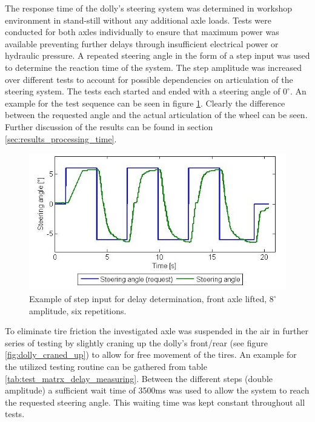 \documentclass[ExampleMasters.tex]{subfiles}
\begin{document}
The response time of the dolly's steering system was determined in workshop environment in stand-still without any additional axle loads. Tests were conducted for both axles individually to ensure that maximum power was available preventing further delays through insufficient electrical power or hydraulic pressure. A repeated steering angle in the form of a step input was used to determine the reaction time of the system. The step amplitude was increased over different tests to account for possible dependencies on articulation of the steering system. The tests each started and ended with a steering angle of $0^\circ .$ An example for the test sequence can be seen in figure \ref{fig:example_for_step_input_delay_measuring}. Clearly the difference between the requested angle and the actual articulation of the wheel can be seen. Further discussion of the results can be found in section \ref{sec:results_processing_time}.\\

\begin{figure}
\centering
\includegraphics[width=1\linewidth]{figures/example_for_step_input_delay_measuring}
\caption{Example of step input for delay determination, front axle lifted, $8^\circ $ amplitude, six repetitions.}
\label{fig:example_for_step_input_delay_measuring}
\end{figure}


To eliminate tire friction the investigated axle was suspended in the air in further series of testing by slightly craning up the dolly's front/rear (see figure \ref{fig:dolly_craned_up}) to allow for free movement of the tires. An example for the utilized testing routine can be gathered from table \ref{tab:test_matrx_delay_measuring}. Between the different steps (double amplitude) a sufficient wait time of 3500ms was used to allow the system to reach the requested steering angle. This waiting time was kept constant throughout all tests. \\
\end{document}
